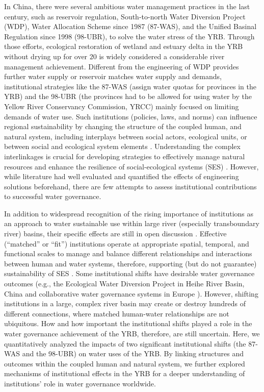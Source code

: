 In China, there were several ambitious water management practices in the last century, such as reservoir regulation, South-to-north Water Diversion Project (WDP), Water Allocation Scheme since 1987 (87-WAS), and the Unified Basinal Regulation since 1998 (98-UBR), to solve the water stress of the YRB.
Through those efforts, ecological restoration of wetland and estuary delta in the YRB without drying up for over $20$ is widely considered a considerable river management achievement.
Different from the engineering of WDP provides further water supply or reservoir matches water supply and demands, institutional strategies like the 87-WAS (assign water quotas for provinces in the YRB) and the 98-UBR (the provinces had to be allowed for using water by the Yellow River Conservancy Commission, YRCC) mainly focused on limiting demands of water use.
Such institutions (policies, laws, and norms) can influence regional sustainability by changing the structure of the coupled human, and natural system, including interplays between social actors, ecological units, or between social and ecological system elements \cite{young2008,cumming2020b,lien2020, bodin2017b}.
Understanding the complex interlinkages is crucial for developing strategies to effectively manage natural resources and enhance the resilience of social-ecological systems (SES) \cite{kluger2020}.
However, while literature had well evaluated and quantified the effects of engineering solutions beforehand, there are few attempts to assess institutional contributions to successful water governance.

In addition to widespread recognition of the rising importance of institutions as an approach to water sustainable use within large river (especially transboundary river) basins, their specific effects are still in open discussion \cite{agrawal2003, persha2011, agrawal2001}.
Effective (``matched'' or ``fit'') institutions operate at appropriate spatial, temporal, and functional scales to manage and balance different relationships and interactions between human and water systems, therefore, supporting (but do not guarantee) sustainability of SES \cite{epstein2015, wang2019d}.
Some institutional shifts have desirable water governance outcomes (e.g., the Ecological Water Diversion Project in Heihe River Basin, China \cite{wang2019d} and collaborative water governance systems in Europe \cite{green2013}).
However, shifting institutions in a large, complex river basin may create or destroy hundreds of different connections, where matched human-water relationships are not ubiquitous.
How and how important the institutional shifts played a role in the water governance achievement of the YRB, therefore, are still uncertain.
Here, we quantitatively analyzed the impacts of two significant institutional shifts (the 87-WAS and the 98-UBR) on water uses of the YRB.
By linking structures and outcomes within the coupled human and natural system, we further explored mechanisms of institutional effects in the YRB for a deeper understanding of institutions' role in water governance worldwide.
